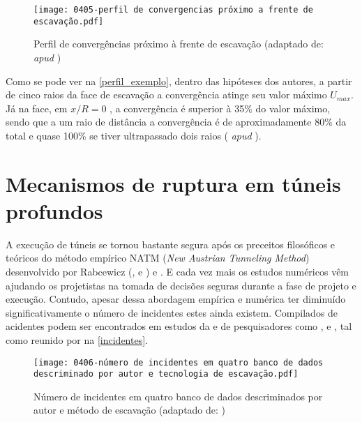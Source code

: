 \begin{figure}[H]
	\begin{center}
		\texttt{[image: 0405-perfil de convergencias próximo a frente de escavação.pdf]}
	\end{center}
	\caption{\label{perfil_exemplo}Perfil de convergências próximo à frente de escavação (adaptado de:  \textit{apud} )}
\end{figure}

Como se pode ver na \autoref{perfil_exemplo}, dentro das hipóteses dos autores, a partir de cinco raios da face de escavação a convergência atinge seu valor máximo  $U_{max}$. Já na face, em $x/R=0$ , a convergência é superior à 35\% do valor máximo, sendo que a um raio de distância a convergência é de aproximadamente 80\% da total e quase 100\% se tiver ultrapassado dois raios ( \textit{apud} ).

\section{Mecanismos de ruptura em túneis profundos}

A execução de túneis se tornou bastante segura após os preceitos filosóficos e teóricos do método empírico NATM (\textit{New Austrian Tunneling Method}) desenvolvido por Rabcewicz (\citeyear{Rabcewicz1964a}, \citeyear{Rabcewicz1964b} e \citeyear{Rabcewicz1964c}) e . E cada vez mais os estudos numéricos vêm ajudando os projetistas na tomada de decisões seguras durante a fase de projeto e execução. Contudo, apesar dessa abordagem empírica e numérica ter diminuído significativamente o número de incidentes estes ainda existem. Compilados de acidentes podem ser encontrados em estudos da  e de pesquisadores como ,  e , tal como reunido por  na \autoref{incidentes}.

\begin{figure}[H]
	\begin{center}
		\texttt{[image: 0406-número de incidentes em quatro banco de dados descriminado por autor e tecnologia de escavação.pdf]}
	\end{center}
	\caption{\label{incidentes}Número de incidentes em quatro banco de dados descriminados por autor e método de escavação (adaptado de: )}
\end{figure}

